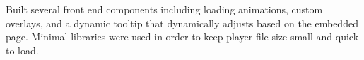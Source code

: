 \documentclass[]{deedy-resume-openfont}
\begin{document}
\begin{minipage}[t]{0.66\textwidth}
Built several front end components including loading animations, custom overlays, and a dynamic tooltip that dynamically adjusts based on the embedded page. Minimal libraries were used in order to keep player file size small and quick to load.
\sectionsep

\end{minipage} 
\end{document}
